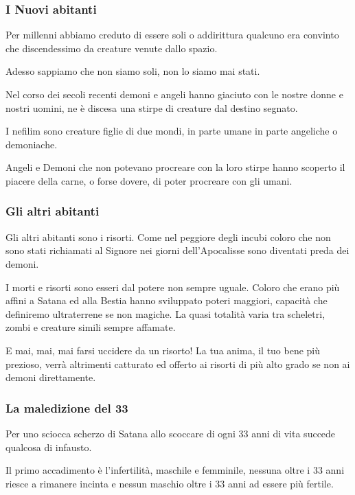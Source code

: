 \documentclass[12pt,a4paper,twoside,openany]{book}
\begin{document}
\begin{multicols}{2}
\subsubsection{I Nuovi abitanti}

Per millenni abbiamo creduto di essere soli o addirittura qualcuno era convinto che discendessimo da creature venute dallo spazio.

Adesso sappiamo che non siamo soli, non lo siamo mai stati.

Nel corso dei secoli recenti demoni e angeli hanno giaciuto con le nostre donne e nostri uomini, ne è discesa una stirpe di creature dal destino segnato.

I nefilim sono creature figlie di due mondi, in parte umane in parte angeliche o demoniache.

Angeli e Demoni che non potevano procreare con la loro stirpe hanno scoperto il piacere della carne, o forse dovere, di poter  procreare con gli umani.

\subsubsection{Gli altri abitanti}

Gli altri abitanti sono i risorti. Come nel peggiore degli incubi coloro che non sono stati richiamati al Signore nei giorni dell'Apocalisse sono diventati preda dei demoni.

I morti e risorti sono esseri dal potere non sempre uguale. Coloro che erano più affini a Satana ed alla Bestia hanno sviluppato poteri maggiori, capacità che definiremo ultraterrene se non magiche. La quasi totalità varia tra scheletri, zombi e creature simili sempre affamate.

E mai, mai, mai farsi uccidere da un risorto! La tua anima, il tuo bene più prezioso, verrà altrimenti catturato ed offerto ai risorti di più alto grado se non ai demoni direttamente.


\subsubsection{La maledizione del 33}

Per uno sciocca scherzo di Satana allo scoccare di ogni 33 anni di vita succede qualcosa di infausto. 

Il primo accadimento è l'infertilità, maschile e femminile, nessuna oltre i 33 anni riesce a rimanere incinta e nessun maschio oltre i 33 anni ad essere più fertile.


\end{multicols}
\end{document}
